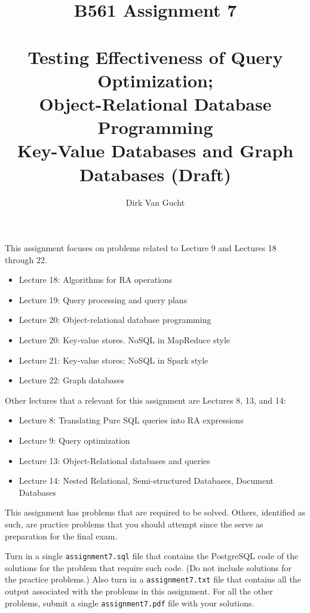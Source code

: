 \documentclass{article}
\begin{document}
\title{B561 Assignment 7\\
\ \\
Testing Effectiveness of Query Optimization; \\
Object-Relational Database Programming \\
Key-Value Databases and Graph Databases (Draft) }
\author{Dirk Van Gucht}
\date{}
\maketitle

This assignment focuses on problems related to Lecture 9 and Lectures 18 through 22.
\begin{itemize}
\item Lecture 18:  Algorithms for RA operations
\item Lecture 19:  Query processing and query plans
\item Lecture 20:  Object-relational database programming
\item Lecture 20:  Key-value stores.  NoSQL in MapReduce style
\item Lecture 21:  Key-value stores;  NoSQL in Spark style
\item Lecture 22:  Graph databases
\end{itemize}
Other lectures that a relevant for this assignment are Lectures 8, 13, and 14:
\begin{itemize}
\item Lecture 8:  Translating Pure SQL queries into RA expressions
\item Lecture 9:  Query optimization
\item Lecture 13:  Object-Relational databases and queries
\item Lecture 14:  Nested Relational, Semi-structured Databases, Document Databases
\end{itemize}
\vfill

This assignment has problems that are required to be solved.  Others, identified as such, are practice problems that you should attempt since the serve as preparation for the final exam.

Turn in a single {\tt assignment7.sql} file that contains the PostgreSQL code of the solutions for the problem that require such code.   
(Do not include solutions for the practice problems.)
Also turn in a {\tt assignment7.txt} file that contains all the output associated with the problems
in this assignment.
For all the other problems, submit a single {\tt assignment7.pdf} file with your solutions.
\end{document}
